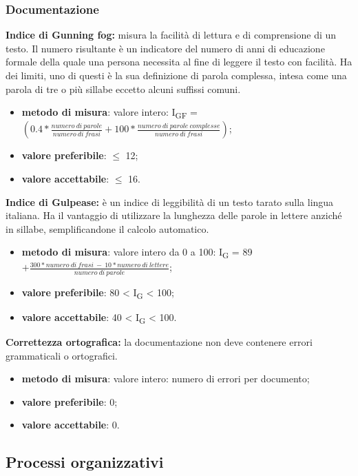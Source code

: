 \subsubsection{Documentazione}
\textbf{Indice di Gunning fog:} misura la facilità di lettura e di comprensione di un testo. Il numero risultante è un indicatore del numero di anni 
di educazione formale della quale una persona necessita al fine di leggere il testo con facilità.
Ha dei limiti, uno di questi è la sua definizione di parola complessa, intesa come una parola di
tre o più sillabe eccetto alcuni suffissi comuni.
\begin{itemize}
    \item \textbf{metodo di misura}: valore intero: I\textsubscript{GF} = $(0.4 *\frac{numero \ di \ parole}{numero \ di \ frasi} + 100 * \frac{numero \ di \ parole \ complesse}{numero \ di \ frasi})$;
    \item \textbf{valore preferibile}: $\leq$ 12;
    \item \textbf{valore accettabile}: $\leq$ 16.
\end{itemize}
\textbf{Indice di Gulpease:} è un indice di leggibilità di un testo tarato sulla lingua italiana. 
Ha il vantaggio di utilizzare la lunghezza delle parole in lettere anziché in sillabe, semplificandone il calcolo automatico. 
\begin{itemize}
    \item \textbf{metodo di misura}: valore intero da 0 a 100: I\textsubscript{G} = 89 $+ \frac{300*numero \ di \ frasi \ - \ 10*numero \ di \ lettere}{numero \ di \ parole}$;
    \item \textbf{valore preferibile}: 80 < I\textsubscript{G} < 100;
    \item \textbf{valore accettabile}: 40 < I\textsubscript{G} < 100.
\end{itemize}
\textbf{Correttezza ortografica:} la documentazione non deve contenere errori grammaticali o ortografici. 
\begin{itemize}
    \item \textbf{metodo di misura}: valore intero: numero di errori per documento;
    \item \textbf{valore preferibile}: 0;
    \item \textbf{valore accettabile}: 0.
\end{itemize}
\subsection{Processi organizzativi}
